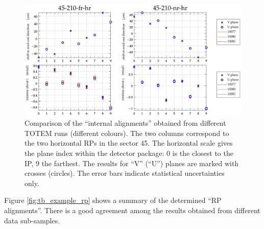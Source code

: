 \documentclass[TOTEM]{cern/cernphprep}
\begin{document}
\begin{figure}[h!]
\begin{center}
\includegraphics[width=0.8\hsize]{fig/calibration_fill/plots_per_plane_left.pdf}
\caption{%
Comparison of the ``internal alignments'' obtained from different TOTEM runs (different colours). The two columns correspond to the two horizontal RPs in the sector 45. The horizontal scale gives the plane index within the detector package: 0 is the closest to the IP, 9 the farthest. The results for ``V'' (``U'') planes are marked with crosses (circles). The error bars indicate statistical uncertainties only.
}
\label{fig:tb_example_internal}
\end{center}
\end{figure}

Figure \ref{fig:tb_example_rp} shows a summary of the determined ``RP alignments''. There is a good agreement among the results obtained from different data sub-samples.
\end{document}
